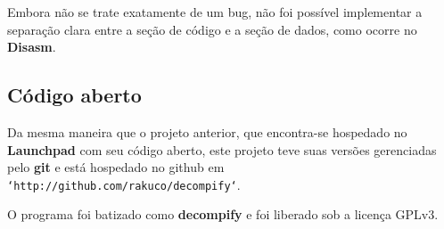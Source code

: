 \documentclass{article}
\begin{document}
Embora não se trate exatamente de um bug, não foi possível implementar a separação clara entre a seção de código e a seção de dados, como ocorre no \textbf{Disasm}.

\subsection{Código aberto}
Da mesma maneira que o projeto anterior, que encontra-se hospedado no \textbf{Launchpad} com seu código aberto, este projeto teve suas versões gerenciadas pelo \textbf{git} e está hospedado no github em \texttt{`http://github.com/rakuco/decompify`}.

O programa foi batizado como \textbf{decompify} e foi liberado sob a licença GPLv3.
\end{document}
